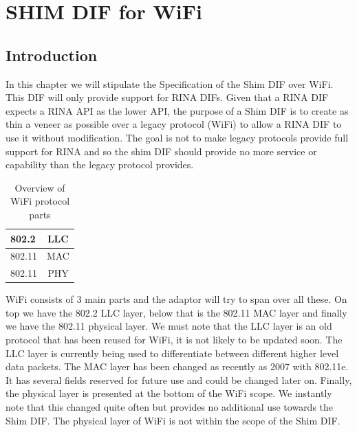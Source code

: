 

\chapter{SHIM DIF for WiFi}

\section{Introduction}

In this chapter we will stipulate the Specification of the Shim DIF over WiFi. This DIF will only provide support for RINA DIFs. Given that a RINA DIF expects a RINA API as the lower API, the purpose of a Shim DIF is to create as thin a veneer as possible over a legacy protocol (WiFi) to allow a RINA DIF to use it without modification.  The goal is not to make legacy protocols provide full support for RINA and so the shim DIF should provide no more service or capability than the legacy protocol provides.

\npar

\begin{table}[H]
		\begin{center}
		\begin{tabular}{|lc|}
			\hline
				802.2 & LLC		\\ \hline
				802.11 & MAC		\\ \hline
				802.11 & PHY		\\
			\hline
		\end{tabular}
		\caption{Overview of WiFi protocol parts}
		\end{center}
\end{table}

WiFi consists of 3 main parts and the adaptor will try to span over all these. On top we have the 802.2 LLC layer, below that is the 802.11 MAC layer and finally we have the 802.11 physical layer. We must note that the LLC layer is an old protocol that has been reused for WiFi, it is not likely to be updated soon. The LLC layer is currently being used to differentiate between different higher level data packets. The MAC layer has been changed as recently as 2007 with 802.11e. It has several fields reserved for future use and could be changed later on. Finally, the physical layer is presented at the bottom of the WiFi scope. We instantly note that this changed quite often but provides no additional use towards the Shim DIF. The physical layer of WiFi is not within the scope of the Shim DIF. 

\npar


